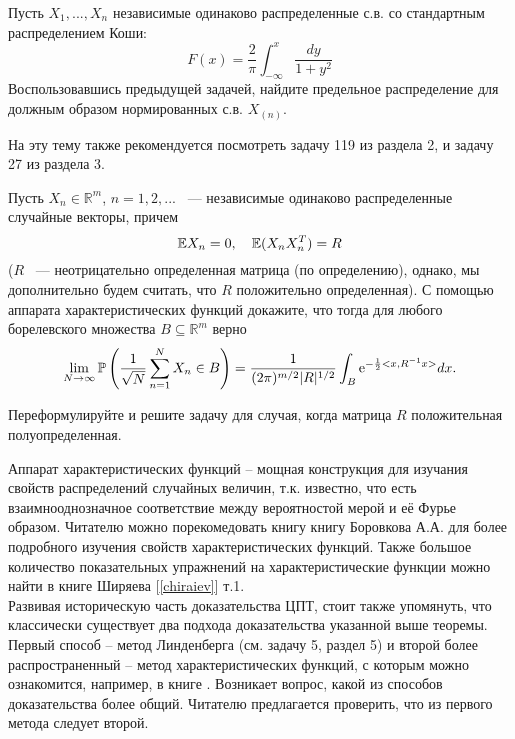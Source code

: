 \begin{problem}

Пусть $X_{1} ,...,X_{n} $ независимые одинаково распределенные с.в. со стандартным распределением Коши:
$$
F\left(x\right)=\frac{2}{\pi } \int _{-\infty }^{x}\frac{dy}{1+y^{2}}  
$$ 
Воспользовавшись предыдущей задачей, найдите предельное распределение для должным образом нормированных с.в. $X_{\left(n\right)} $.
\end{problem}
\begin{remark}
На эту тему также рекомендуется посмотреть задачу 119 из раздела 2, и задачу 27 из раздела 3.
\end{remark}


\begin{problem}
Пусть ${X}_{n} \in {\mathbb R}^{m} $, $n=1,2,...$ ~--- независимые одинаково распределенные случайные векторы, причем  
$$\mathrm{{\mathbb E}}{X}_{n} =0, \quad \mathrm{{\mathbb E}}({X}_{n} {X}_{n}^{T}) =R$$ ($R$ ~--- неотрицательно определенная матрица (по определению), однако, мы дополнительно будем считать, что $R$ положительно определенная). С помощью аппарата характеристических функций докажите, что тогда для любого борелевского множества $B\subseteq {\mathbb R}^{m} $ верно
\[\mathop{\lim }\limits_{N\to \infty } \mathrm{{\mathbb P}}\left(\frac{1}{\sqrt{N} } \sum _{n=1}^{N}{X}_{n}  \in B\right)=\dfrac{1}{(2\pi)^{m/2}|R|^{1/2}} \int _{B}{\rm e}^{-\frac{1}{2} <{x},R^{-1}{x}>} d {x} .\] 

Переформулируйте и решите задачу для случая, когда матрица $R$ положительная полуопределенная.
\end{problem}
\begin{remark}
Аппарат характеристических функций -- мощная конструкция для изучания свойств распределений случайных величин, т.к. известно, что есть взаимнооднозначное соответствие между вероятностой мерой и её Фурье образом. Читателю можно порекомедовать книгу книгу Боровкова А.А. \cite{3} для более подробного изучения свойств характеристических функций. Также большое количество показательных упражнений на характеристические функции можно найти в книге Ширяева [\ref{chiraiev}] т.1.\\
\indent Развивая историческую часть доказательства ЦПТ, стоит также упомянуть, что классически существует два подхода доказательства указанной выше теоремы. Первый способ -- метод Линденберга (см. задачу 5, раздел 5) и второй более распространенный -- метод характеристических функций, с которым можно ознакомится, например, в книге \cite{6}. Возникает вопрос, какой из способов доказательства более общий. Читателю предлагается проверить, что из первого метода следует второй.
\end{remark}




